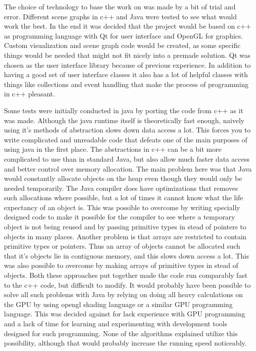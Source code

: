 \documentclass[a4paper,12pt]{report}
\begin{document}
The choice of technology to base the work on was made by a bit of trial and error. Different scene graphs in c++ and Java were tested to see what would work the best. In the end it was decided that the project would be based on c++ as programming language with Qt for user interface and OpenGL for graphics. Custom visualization and scene graph code would be created, as some specific things would be needed that might not fit nicely into a premade solution. Qt was chosen as the user interface library because of previous experience. In addition to having a good set of user interface classes it also has a lot of helpful classes with things like collections and event handling that make the process of programming in c++ pleasant.

Some tests were initially conducted in java by porting the code from c++ as it was made. Although the java runtime itself is theoretically fast enough, naively using it's methods of abstraction slows down data access a lot. This forces you to write complicated and unreadable code that defeats one of the main purposes of using java in the first place. The abstractions in c++ can be a bit more complicated to use than in standard Java, but also allow much faster data access and better control over memory allocation. The main problem here was that Java would constantly allocate objects on the heap even though they would only be needed temporarily. The Java compiler does have optimizations that removes such allocations where possible, but a lot of times it cannot know what the life expectancy of an object is. This was possible to overcome by writing specially designed code to make it possible for the compiler to see where a temporary object is not being reused and by passing primitive types in stead of pointers 
to objects in many places. Another problem is that arrays are restricted to contain primitive types or pointers. Thus an array of objects cannot be allocated such that it's objects lie in contiguous memory, and this slows down access a lot. This was also possible to overcome by making arrays of primitive types in stead of objects. Both these approaches put together made the code run comparably fast to the c++ code, but difficult to modify. It would probably have been possible to solve all such problems with Java by relying on doing all heavy calculations on the GPU by using opengl shading language or a similar GPU programming language. This was decided against for lack experience with GPU programming and a lack of time for learning and experimenting with development tools designed for such programming. None of the algorithms explained utilize this possibility, although that would probably increase the 
running speed noticeably.
\end{document}
